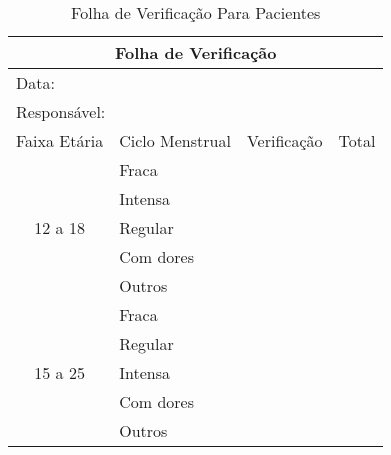\documentclass{article}
\begin{document}
\begin{table}[h!]
\centering
\caption{ Folha de Verificação Para Pacientes}
\begin{tabular}{|clll|}
\hline
\multicolumn{4}{|c|}{Folha de Verificação}                                                                                       \\ \hline
\multicolumn{4}{|l|}{Data:}                                                                                                      \\ \hline
\multicolumn{4}{|l|}{Responsável:}                                                                                               \\ \hline
\multicolumn{1}{|c|}{Faixa Etária}             & \multicolumn{1}{c|}{Ciclo Menstrual} & \multicolumn{1}{c|}{Verificação} & Total \\ \hline
\multicolumn{1}{|c|}{\multirow{5}{*}{12 a 18}} & \multicolumn{1}{l|}{Fraca}           & \multicolumn{1}{l|}{}            &       \\ \cline{2-4} 
\multicolumn{1}{|c|}{}                         & \multicolumn{1}{l|}{Intensa}         & \multicolumn{1}{l|}{}            &       \\ \cline{2-4} 
\multicolumn{1}{|c|}{}                         & \multicolumn{1}{l|}{Regular}         & \multicolumn{1}{l|}{}            &       \\ \cline{2-4} 
\multicolumn{1}{|c|}{}                         & \multicolumn{1}{l|}{Com dores}       & \multicolumn{1}{l|}{}            &       \\ \cline{2-4} 
\multicolumn{1}{|c|}{}                         & \multicolumn{1}{l|}{Outros}          & \multicolumn{1}{l|}{}            &       \\ \hline
\multicolumn{1}{|c|}{\multirow{5}{*}{15 a 25}} & \multicolumn{1}{l|}{Fraca}           & \multicolumn{1}{l|}{}            &       \\ \cline{2-4} 
\multicolumn{1}{|c|}{}                         & \multicolumn{1}{l|}{Regular}         & \multicolumn{1}{l|}{}            &       \\ \cline{2-4} 
\multicolumn{1}{|c|}{}                         & \multicolumn{1}{l|}{Intensa}         & \multicolumn{1}{l|}{}            &       \\ \cline{2-4} 
\multicolumn{1}{|c|}{}                         & \multicolumn{1}{l|}{Com dores}       & \multicolumn{1}{l|}{}            &       \\ \cline{2-4} 
\multicolumn{1}{|c|}{}                         & \multicolumn{1}{l|}{Outros}          & \multicolumn{1}{l|}{}            &       \\ \hline

\end{tabular}
\end{table}
\end{document}
